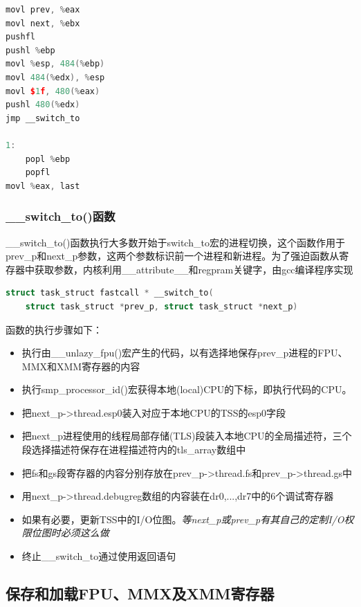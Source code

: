 \begin{lstlisting}[language=C++, caption={对于switch\_to的过程描述}]
movl prev, %eax
movl next, %ebx
pushfl
pushl %ebp
movl %esp, 484(%ebp)
movl 484(%edx), %esp
movl $1f, 480(%eax)
pushl 480(%edx)
jmp __switch_to

1: 
    popl %ebp
    popfl
movl %eax, last
\end{lstlisting}

\subsubsection{\_\_switch\_to()函数}

    \_\_switch\_to()函数执行大多数开始于switch\_to宏的进程切换，这个函数作用于prev\_p和next\_p参数，这两个参数标识前一个进程和新进程。为了强迫函数从寄存器中获取参数，内核利用\_\_attribute\_\_和regpram关键字，由gcc编译程序实现

\begin{lstlisting}[language=C++]
struct task_struct fastcall * __switch_to(
    struct task_struct *prev_p, struct task_struct *next_p)
\end{lstlisting}

    函数的执行步骤如下：

\begin{itemize}
    \item 执行由\_\_unlazy\_fpu()宏产生的代码，以有选择地保存prev\_p进程的FPU、MMX和XMM寄存器的内容
    \item 执行smp\_processor\_id()宏获得本地(local)CPU的下标，即执行代码的CPU。
    \item 把next\_p->thread.esp0装入对应于本地CPU的TSS的esp0字段
    \item 把next\_p进程使用的线程局部存储(TLS)段装入本地CPU的全局描述符，三个段选择描述符保存在进程描述符内的tls\_array数组中
    \item 把fs和gs段寄存器的内容分别存放在prev\_p->thread.fs和prev\_p->thread.gs中
    \item 用next\_p->thread.debugreg数组的内容装在dr0,...,dr7中的6个调试寄存器
    \item 如果有必要，更新TSS中的I/O位图。\emph{等next\_p或prev\_p有其自己的定制I/O权限位图时必须这么做}
    \item 终止\_\_switch\_to通过使用返回语句
\end{itemize}

\subsection{保存和加载FPU、MMX及XMM寄存器}

